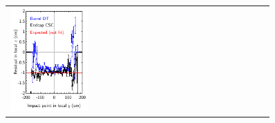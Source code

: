 \documentclass[12pt]{article}
\begin{document}
\begin{figure}
\begin{center}
\begin{tabular}{p{0.3\linewidth} p{0.3\linewidth} p{0.3\linewidth}}
\begin{minipage}{\linewidth}
	\includegraphics[width=\linewidth]{chamber_alignment/x_xresid_vs_y.pdf}
      \end{minipage} &
      \begin{minipage}{\linewidth}

\end{minipage}
\end{tabular}
\end{center}
\end{figure}
\end{document}
